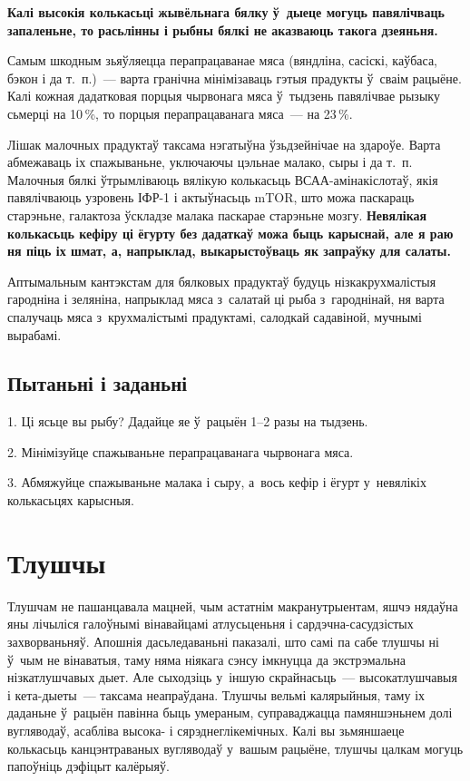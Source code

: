 \textbf{Калі высокія колькасьці жывёльнага бялку ў~дыеце могуць павялічваць запаленьне, то расьлінны і рыбны бялкі не аказваюць такога дзеяньня.}

Самым шкодным зьяўляецца перапрацаванае мяса (вяндліна, сасіскі, каўбаса, бэкон і да т.~п.)~--- варта гранічна мінімізаваць гэтыя прадукты ў~сваім рацыёне. Калі кожная дадатковая порцыя чырвонага мяса ў~тыдзень павялічвае рызыку сьмерці на 10\,\%, то порцыя перапрацаванага мяса~--- на 23\,\%.

Лішак малочных прадуктаў таксама нэгатыўна ўзьдзейнічае на здароўе. Варта абмежаваць іх спажываньне, уключаючы цэльнае малако, сыры і да т.~п. Малочныя бялкі ўтрымліваюць вялікую колькасьць ВСАА-амінакіслотаў, якія павялічваюць узровень ІФР-1 і актыўнасьць mTOR, што можа паскараць старэньне, галактоза ўскладзе малака паскарае старэньне мозгу. \textbf{Невялікая колькасьць кефіру ці ёгурту без дадаткаў можа быць карыснай, але я раю ня піць іх шмат, а, напрыклад, выкарыстоўваць як запраўку для салаты.}

Аптымальным кантэкстам для бялковых прадуктаў будуць нізкакрухмалістыя гародніна і зеляніна, напрыклад мяса з~салатай ці рыба з~гароднінай, ня варта спалучаць мяса з~крухмалістымі прадуктамі, салодкай садавіной, мучнымі вырабамі.

\subsection*{Пытаньні і заданьні}

1. Ці ясьце вы рыбу? Дадайце яе ў~рацыён 1--2 разы на тыдзень.

2. Мінімізуйце спажываньне перапрацаванага чырвонага мяса.

3. Абмяжуйце спажываньне малака і сыру, а~вось кефір і ёгурт у~невялікіх колькасьцях карысныя.


\section{Тлушчы}

Тлушчам не пашанцавала мацней, чым астатнім макранутрыентам, яшчэ нядаўна яны лічыліся галоўнымі вінавайцамі атлусьценьня і сардэчна-сасудзістых захворваньняў. Апошнія дасьледаваньні паказалі, што самі па сабе тлушчы ні ў~чым не вінаватыя, таму няма ніякага сэнсу імкнуцца да экстрэмальна нізкатлушчавых дыет. Але сыходзіць у~іншую скрайнасьць~--- высокатлушчавыя і кета-дыеты~--- таксама неапраўдана. Тлушчы вельмі калярыйныя, таму іх даданьне ў~рацыён павінна быць умераным, суправаджацца памяншэньнем долі вугляводаў, асабліва высока- і сярэднеглікемічных. Калі вы зьмяншаеце колькасьць канцэнтраваных вугляводаў у~вашым рацыёне, тлушчы цалкам могуць папоўніць дэфіцыт калёрыяў.

